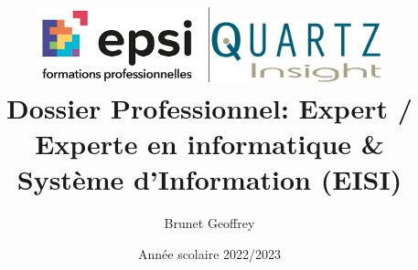 \documentclass[a4paper, 11pt]{report}
\begin{document}
\graphicspath{ {images/} }

\title{{\includegraphics[width = 50mm]{./logos/logo-epsi-v2.png}}{\includegraphics[width = 50mm]{./logos/logo-quartz-insight-v2.png}}\\[2cm]Dossier Professionnel: Expert / Experte en informatique \& Système d’Information (EISI)}
\author{Brunet Geoffrey}
\date{Année scolaire 2022/2023}
\renewcommand{\maketitlehookb}{\centering Entreprise: Quartz Insight, École: EPSI campus d'Auxerre \newline Responsable de formation: Alexandre Lemaire}
\maketitle



\newpage
\thispagestyle{empty}
\mbox{}

\tableofcontents
\end{document}

